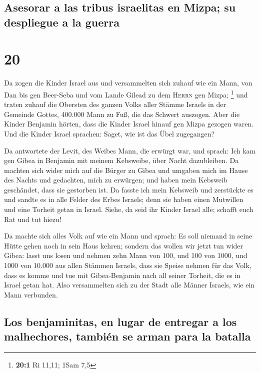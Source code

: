 \hypertarget{asesorar-a-las-tribus-israelitas-en-mizpa-su-despliegue-a-la-guerra}{%
\subsection{Asesorar a las tribus israelitas en Mizpa; su despliegue a
la
guerra}\label{asesorar-a-las-tribus-israelitas-en-mizpa-su-despliegue-a-la-guerra}}

\hypertarget{section-19}{%
\section{20}\label{section-19}}

 Da zogen die Kinder Israel aus und versammelten sich
zuhauf wie ein Mann, von Dan bis gen Beer-Seba und vom Lande Gilead zu
dem \textsc{Herrn} gen Mizpa; \footnote{\textbf{20:1} Ri 11,11; 1Sam 7,5}
 und traten zuhauf die Obersten des ganzen Volks aller
Stämme Israels in der Gemeinde Gottes, 400.000 Mann zu Fuß, die das
Schwert auszogen.  Aber die Kinder Benjamin hörten, dass
die Kinder Israel hinauf gen Mizpa gezogen waren. Und die Kinder Israel
sprachen: Saget, wie ist das Übel zugegangen?

 Da antwortete der Levit, des Weibes Mann, die erwürgt
war, und sprach: Ich kam gen Gibea in Benjamin mit meinem Kebsweibe,
über Nacht dazubleiben.  Da machten sich wider mich auf
die Bürger zu Gibea und umgaben mich im Hause des Nachts und gedachten,
mich zu erwürgen; und haben mein Kebsweib geschändet, dass sie gestorben
ist.  Da fasste ich mein Kebsweib und zerstückte es und
sandte es in alle Felder des Erbes Israels; denn sie haben einen
Mutwillen und eine Torheit getan in Israel.  Siehe, da
seid ihr Kinder Israel alle; schafft euch Rat und tut hiezu!

 Da machte sich alles Volk auf wie ein Mann und sprach: Es
soll niemand in seine Hütte gehen noch in sein Haus kehren;
 sondern das wollen wir jetzt tun wider Gibea:
 lasst uns losen und nehmen zehn Mann von 100, und 100
von 1000, und 1000 von 10.000 aus allen Stämmen Israels, dass sie Speise
nehmen für das Volk, dass es komme und tue mit Gibea-Benjamin nach all
seiner Torheit, die es in Israel getan hat.  Also
versammelten sich zu der Stadt alle Männer Israels, wie ein Mann
verbunden.

\hypertarget{los-benjaminitas-en-lugar-de-entregar-a-los-malhechores-tambiuxe9n-se-arman-para-la-batalla}{%
\subsection{Los benjaminitas, en lugar de entregar a los malhechores,
también se arman para la
batalla}\label{los-benjaminitas-en-lugar-de-entregar-a-los-malhechores-tambiuxe9n-se-arman-para-la-batalla}}

